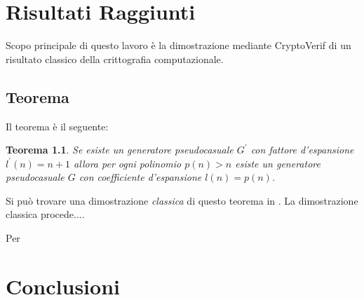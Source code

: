 \documentclass[a4paper,openright,twoside,12pt]{report}
\newtheorem{teorema}{Teorema}[chapter]
\begin{document}
\chapter{Risultati Raggiunti}

Scopo principale di questo lavoro \`e la dimostrazione mediante CryptoVerif di un risultato classico della crittografia computazionale.
\section{Teorema}
Il teorema \`e il seguente:\\
\begin{teorema}
Se esiste un generatore pseudocasuale $G^{'}$ con fattore d'espansione $l^{'}(n)=n+1$ allora per ogni polinomio $p(n)>n$ esiste un generatore pseudocasuale $G$ con coefficiente d'espansione
$l(n)=p(n)$.
\end{teorema}

Si pu\`o trovare una dimostrazione \emph{classica} di questo teorema in \cite{1206501}. La dimostrazione classica procede....


Per


\chapter{Conclusioni}
\lhead[\fancyplain{}{\bfseries\thepage}]{\fancyplain{}{\bfseries\rightmark}}
	
		
\end{document}
